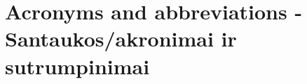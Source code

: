 \chapter*{Acronyms and abbreviations - Santaukos/akronimai ir sutrumpinimai}
\label{cha:acronyms}


